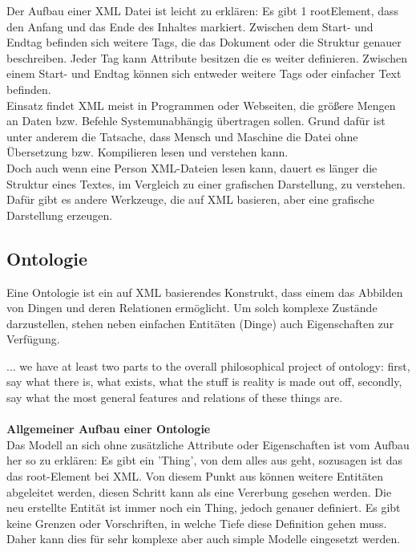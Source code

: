 \newpage

Der Aufbau einer XML Datei ist leicht zu erklären: Es gibt 1 rootElement, dass den Anfang und das Ende des Inhaltes markiert. Zwischen dem Start- und Endtag befinden sich weitere Tags, die das Dokument oder die Struktur genauer beschreiben. Jeder Tag kann Attribute besitzen die es weiter definieren. Zwischen einem Start- und Endtag können sich entweder weitere Tags oder einfacher Text befinden.
\\
Einsatz findet XML meist in Programmen oder Webseiten, die größere Mengen an Daten bzw. Befehle Systemunabhängig übertragen sollen. Grund dafür ist unter anderem die Tatsache, dass Mensch und Maschine die Datei ohne Übersetzung bzw. Kompilieren lesen und verstehen kann.\\
Doch auch wenn eine Person XML-Dateien lesen kann, dauert es länger die Struktur eines Textes, im Vergleich zu einer grafischen Darstellung, zu verstehen.\\  
Dafür gibt es andere Werkzeuge, die auf XML basieren, aber eine grafische Darstellung erzeugen.
\subsection{Ontologie}
Eine Ontologie ist ein auf XML basierendes Konstrukt, dass einem das Abbilden von Dingen und deren Relationen ermöglicht. Um solch komplexe Zustände darzustellen, stehen neben einfachen Entitäten (Dinge) auch Eigenschaften zur Verfügung.

\glqq ... we have at least two parts to the overall philosophical project of ontology: first, say what there is, what exists, what the stuff is reality is made out off, secondly, say what the most general features and relations of these things are. \grqq \cite{ontology_stanford} \\
\\

\textbf{Allgemeiner Aufbau einer Ontologie}\\
Das Modell an sich ohne zusätzliche Attribute oder Eigenschaften ist vom Aufbau her so zu erklären: Es gibt ein 'Thing', von dem alles aus geht, sozusagen ist das das root-Element bei XML. Von diesem Punkt aus können weitere Entitäten abgeleitet werden, diesen Schritt kann als eine Vererbung gesehen werden. Die neu erstellte Entität ist immer noch ein Thing, jedoch genauer definiert. Es gibt keine Grenzen oder Vorschriften, in welche Tiefe diese Definition gehen muss. Daher kann dies für sehr komplexe aber auch simple Modelle eingesetzt werden.\\

